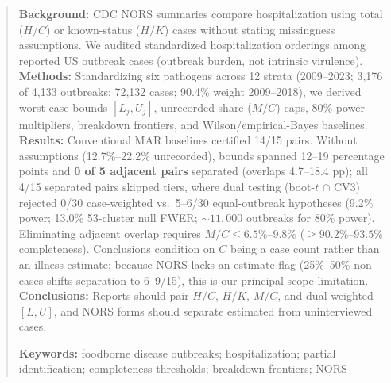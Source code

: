 \begin{abstract}
\noindent\textbf{Background:} CDC NORS summaries compare hospitalization using total ($H/C$) or known-status ($H/K$) cases without stating missingness assumptions. We audited standardized hospitalization orderings among reported US outbreak cases (outbreak burden, not intrinsic virulence).\\
\textbf{Methods:} Standardizing six pathogens across 12 strata (2009--2023; 3,176 of 4,133 outbreaks; 72,132 cases; 90.4\% weight 2009--2018), we derived worst-case bounds $[L_j, U_j]$, unrecorded-share ($M/C$) caps, 80\%-power multipliers, breakdown frontiers, and Wilson/empirical-Bayes baselines.\\
\textbf{Results:} Conventional MAR baselines certified 14/15 pairs. Without assumptions (12.7\%--22.2\% unrecorded), bounds spanned 12--19 percentage points and \textbf{0 of 5 adjacent pairs} separated (overlaps 4.7--18.4 pp); all 4/15 separated pairs skipped tiers, where dual testing (boot-$t$ $\cap$ CV3) rejected 0/30 case-weighted vs.\ 5--6/30 equal-outbreak hypotheses (9.2\% power; 13.0\% 53-cluster null FWER; $\sim 11,000$ outbreaks for 80\% power). Eliminating adjacent overlap requires $M/C \le 6.5\%$--$9.8\%$ ($\ge 90.2\%$--$93.5\%$ completeness). Conclusions condition on $C$ being a case count rather than an illness estimate; because NORS lacks an estimate flag (25\%--50\% non-cases shifts separation to 6--9/15), this is our principal scope limitation.\\
\textbf{Conclusions:} Reports should pair $H/C$, $H/K$, $M/C$, and dual-weighted $[L,U]$, and NORS forms should separate estimated from uninterviewed cases.

\vspace{0.5em}\noindent\textbf{Keywords:} foodborne disease outbreaks; hospitalization; partial identification; completeness thresholds; breakdown frontiers; NORS
\end{abstract}
